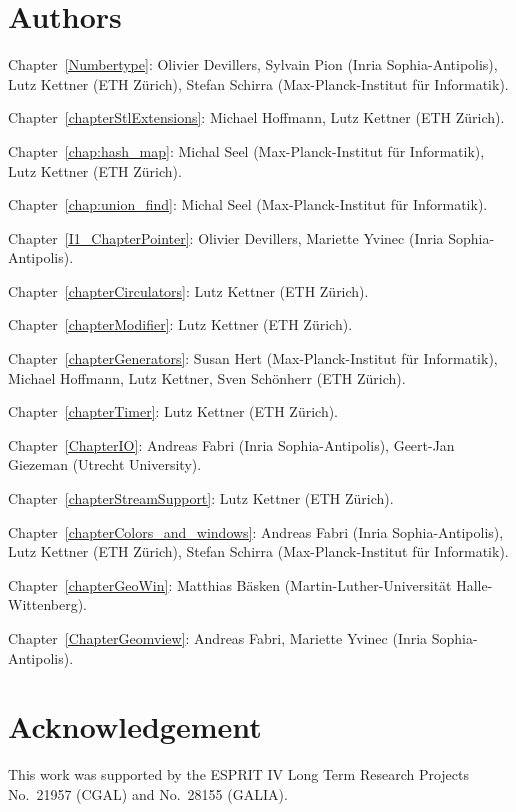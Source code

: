 \section*{Authors}

Chapter~\ref{Numbertype}: 
Olivier Devillers, Sylvain Pion ({\sc Inria} Sophia-Antipolis),
Lutz Kettner (ETH Z\"urich),
Stefan Schirra ({Max-Planck-Institut f\"ur Informatik}).

Chapter~\ref{chapterStlExtensions}: 
Michael Hoffmann, Lutz Kettner (ETH Z\"urich).

Chapter~\ref{chap:hash_map}:
Michal Seel (Max-Planck-Institut f\"ur Informatik),
Lutz Kettner (ETH Z\"urich).

Chapter~\ref{chap:union_find}:
Michal Seel (Max-Planck-Institut f\"ur Informatik).

Chapter~\ref{I1_ChapterPointer}:
Olivier Devillers, Mariette Yvinec ({\sc Inria} Sophia-Antipolis).

Chapter~\ref{chapterCirculators}: 
Lutz Kettner (ETH Z\"urich).

Chapter~\ref{chapterModifier}: 
Lutz Kettner (ETH Z\"urich).

Chapter~\ref{chapterGenerators}: 
Susan Hert (Max-Planck-Institut f\"ur Informatik),
Michael Hoffmann, Lutz Kettner, Sven Sch\"onherr (ETH Z\"urich).

Chapter~\ref{chapterTimer}: 
Lutz Kettner (ETH Z\"urich).

Chapter~\ref{ChapterIO}: 
Andreas Fabri ({\sc Inria} Sophia-Antipolis),
Geert-Jan Giezeman (Utrecht University).

Chapter~\ref{chapterStreamSupport}: 
Lutz Kettner (ETH Z\"urich).

Chapter~\ref{chapterColors_and_windows}:
Andreas Fabri ({\sc Inria} Sophia-Antipolis),
Lutz Kettner (ETH Z\"urich),
Stefan Schirra ({Max-Planck-Institut f\"ur Informatik}).

Chapter~\ref{chapterGeoWin}:
Matthias B\"asken (Martin-Luther-Universit{\"a}t Halle-Wittenberg).

Chapter~\ref{ChapterGeomview}:
Andreas Fabri, Mariette Yvinec ({\sc Inria} Sophia-Antipolis).


\section*{Acknowledgement}

This work was supported
by the ESPRIT IV Long Term Research Projects No.~21957 (CGAL)
and No.~28155 (GALIA).


